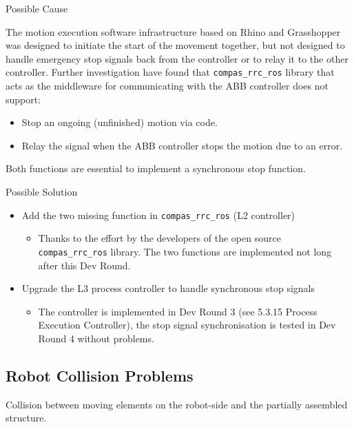 Possible Cause

The motion execution software infrastructure based on Rhino and Grasshopper was designed to initiate the start of the movement together, but not designed to handle emergency stop signals back from the controller or to relay it to the other controller.
Further investigation have found that \verb|compas_rrc_ros| library that acts as the middleware for communicating with the ABB controller does not support:
\begin{itemize}
    \item Stop an ongoing (unfinished) motion via code.
    \item Relay the signal when the ABB controller stops the motion due to an error. 
\end{itemize}

Both functions are essential to implement a synchronous stop function.

Possible Solution

\begin{itemize}
    \item Add the two missing function in \verb|compas_rrc_ros| (L2 controller)
    \begin{itemize}
        \item Thanks to the effort by the developers of the open source \verb|compas_rrc_ros| library. The two functions are implemented not long after this Dev Round. 
    \end{itemize}
    \item Upgrade the L3 process controller to handle synchronous stop signals
    \begin{itemize}
        \item The controller is implemented in Dev Round 3 (see 5.3.15 Process Execution Controller), the stop signal synchronisation is tested in Dev Round 4 without problems.
    \end{itemize}
\end{itemize}

\subsection{Robot Collision Problems}
Collision between moving elements on the robot-side and the partially assembled structure.

